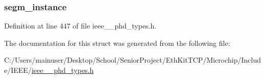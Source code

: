 \subsubsection[{segm\+\_\+instance}]{ segm\+\_\+instance}\label{struct___segm_data_event_descr_a2387f49d78e281ef904794ca400cb308}


Definition at line 447 of file ieee\+\_\+\_\+phd\+\_\+types.\+h.



The documentation for this struct was generated from the following file\+:\begin{DoxyCompactItemize}
\item 
C\+:/\+Users/mainuser/\+Desktop/\+School/\+Senior\+Project/\+Eth\+Kit\+T\+C\+P/\+Microchip/\+Include/\+I\+E\+E\+E/\hyperlink{ieee__11073__phd__types_8h}{ieee\+\_\+\_\+phd\+\_\+types.\+h}\end{DoxyCompactItemize}
